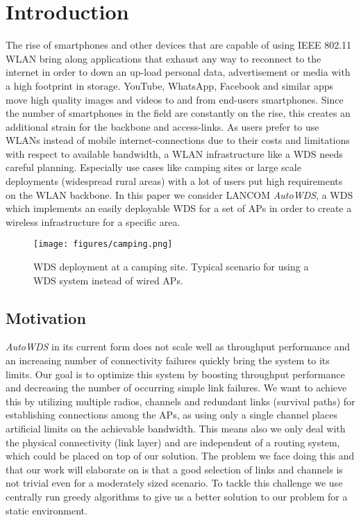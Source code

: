 \chapter{Introduction}
  The rise of smartphones and other devices that are capable of using IEEE 802.11 \ac{WLAN} bring along 
  applications that exhaust any way to reconnect to the internet in order to down an up-load personal data, 
  advertisement or media with a high footprint in storage.
  YouTube, WhatsApp, Facebook and similar apps move high quality images and videos to and from end-users smartphones. 
  Since the number of smartphones in the field are constantly on the rise, 
  this creates an additional strain for the backbone and access-links. 
  As users prefer to use WLANs instead of mobile internet-connections due to their costs and limitations with respect to available bandwidth,
  a \ac{WLAN} infrastructure like a \ac{WDS} needs careful planning. 
  Especially use cases like camping sites or large scale deployments (widespread rural areas) with a lot of users put high requirements on the \ac{WLAN} backbone. 
  In this paper we consider LANCOM \textit{AutoWDS}, 
  a \ac{WDS} which implements an easily deployable \ac{WDS} for a set of APs in order to create a wireless infrastructure for a specific area.

  \begin{figure}[h]
    \centering
    \texttt{[image: figures/camping.png]}
    \caption{WDS deployment at a camping site. Typical scenario for using a \ac{WDS} system instead of wired APs.}
    \label{fig:camping}
  \end{figure}
  
\section{Motivation}
  \textit{AutoWDS} in its current form does not scale well as throughput performance and an increasing number of connectivity failures quickly bring the system to its limits.
  Our goal is to optimize this system by boosting throughput performance and decreasing the number of occurring simple link failures.
  We want to achieve this by utilizing multiple radios, channels and redundant links (survival paths) for establishing connections among the APs, 
  as using only a single channel places artificial limits on the achievable bandwidth.
  This means also we only deal with the physical connectivity (link layer) and are independent of a routing system, 
  which could be placed on top of our solution.
  The problem we face doing this and that our work will elaborate on is that a good selection of links and channels is not trivial even for a moderately sized scenario.
  To tackle this challenge we use centrally run greedy algorithms to give us a better solution to our problem for a static environment.
  
